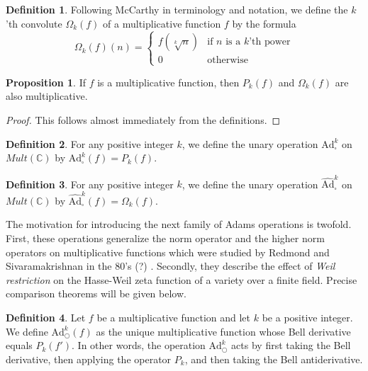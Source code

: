 \documentclass[a4paper]{article}
\theoremstyle{definition}
\newtheorem{definition}{Definition}[section]
\newtheorem{proposition}[theorem]{Proposition}
\theoremstyle{remark}
\newcommand{\adam}[1]{\text{Ad}^{#1}_{\bigcirc}}
\newcommand{\boxadam}[1]{\text{Ad}^{#1}_{\square}}
\newcommand{\hatboxadam}[1]{\widehat{\text{Ad}}^{#1}_{\square}}
\newcommand{\C}{\mathbb{C}}
\newcommand{\twopartdef}[4]
{
	\left\{
		\begin{array}{ll}
			#1 & \mbox{if } #2 \\
			#3 & \mbox{} #4
		\end{array}
	\right.
}
\begin{document}
\begin{definition}
Following McCarthy \cite{} in terminology and notation, we define the $k$'th convolute $\Omega_k(f) $ of a multiplicative function $f$ by the formula 
$$ \Omega_k(f)(n) = \twopartdef { f(\sqrt[k]{n}) } {n \textrm{ is a $k$'th power} } {0} {\textrm{otherwise}}$$
\end{definition}

\begin{proposition}
If $f$ is a multiplicative function, then $P_k(f)$ and $\Omega_k(f)$ are also multiplicative.
\end{proposition}

\begin{proof}
This follows almost immediately from the definitions.
\end{proof}

\begin{definition}
For any positive integer $k$, we define the unary operation $\boxadam{k}$ on $Mult(\C)$ by $\boxadam{k}(f) = P_k(f)$.
\end{definition}

\begin{definition}
For any positive integer $k$, we define the unary operation $\hatboxadam{k}$ on $Mult(\C)$ by $\hatboxadam{k}(f) = \Omega_k(f)$.
\end{definition}


The motivation for introducing the next family of Adams operations is twofold. First, these operations generalize the norm operator and the higher norm operators on multiplicative functions which were studied by Redmond and Sivaramakrishnan in the 80's (?) \cite{}. Secondly, they describe the effect of \emph{Weil restriction} on the Hasse-Weil zeta function of a variety over a finite field. Precise comparison theorems will be given below.


\begin{definition}
Let $f$ be a multiplicative function and let $k$ be a positive integer. We define $\adam{k}(f)$ as the unique multiplicative function whose Bell derivative equals $P_k(f')$. In other words, the operation $\adam{k}$ acts by first taking the Bell derivative, then applying the operator $P_k$, and then taking the Bell antiderivative.

\end{definition}
\end{document}
